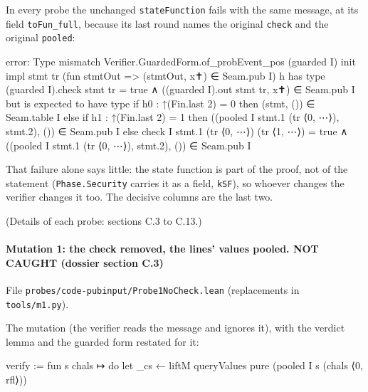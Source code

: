 In every probe the unchanged \texttt{stateFunction} fails with the same message, at its field \texttt{toFun\_\allowbreak{}full}, because its last round names the original \texttt{check} and the original \texttt{pooled}:

\begin{srccode}
error: Type mismatch
  Verifier.GuardedForm.of_probEvent_pos (guarded I) init impl stmt tr (fun stmtOut => (stmtOut, x✝) ∈ Seam.pub I) h
has type
  (guarded I).check stmt tr = true ∧ ((guarded I).out stmt tr, x✝) ∈ Seam.pub I
but is expected to have type
  if h0 : ↑(Fin.last 2) = 0 then (stmt, ()) ∈ Seam.table I
  else
    if h1 : ↑(Fin.last 2) = 1 then ((pooled I stmt.1 (tr ⟨0, ⋯⟩), stmt.2), ()) ∈ Seam.pub I
    else check I stmt.1 (tr ⟨0, ⋯⟩) (tr ⟨1, ⋯⟩) = true ∧ ((pooled I stmt.1 (tr ⟨0, ⋯⟩), stmt.2), ()) ∈ Seam.pub I
\end{srccode}

That failure alone says little: the state function is part of the proof, not of the statement (\texttt{Phase.\allowbreak{}Security} carries it as a field, \texttt{kSF}), so whoever changes the verifier changes it too. The decisive columns are the last two.

(Details of each probe: sections C.3 to C.13.)

\paragraph{Mutation 1: the check removed, the lines' values pooled. NOT CAUGHT (dossier section C.3)}\label{sec:gen-pubinput-C3}

File \texttt{p\allowbreak{}r\allowbreak{}o\allowbreak{}b\allowbreak{}e\allowbreak{}s\allowbreak{}/\allowbreak{}c\allowbreak{}o\allowbreak{}d\allowbreak{}e\allowbreak{}-{}\allowbreak{}p\allowbreak{}u\allowbreak{}b\allowbreak{}i\allowbreak{}n\allowbreak{}p\allowbreak{}u\allowbreak{}t\allowbreak{}/\allowbreak{}P\allowbreak{}r\allowbreak{}o\allowbreak{}b\allowbreak{}e\allowbreak{}1\allowbreak{}N\allowbreak{}o\allowbreak{}C\allowbreak{}h\allowbreak{}e\allowbreak{}c\allowbreak{}k\allowbreak{}.\allowbreak{}l\allowbreak{}e\allowbreak{}a\allowbreak{}n} (replacements in \texttt{tools/\allowbreak{}m1.\allowbreak{}py}).

The mutation (the verifier reads the message and ignores it), with the verdict lemma and the guarded form restated for it:

\begin{leancode}
  verify := fun s chals ↦ do
    let _cs ← liftM queryValues
    pure (pooled I s (chals ⟨0, rfl⟩))
\end{leancode}

